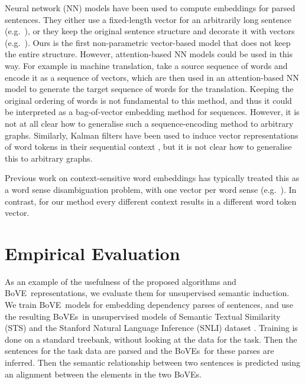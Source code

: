 \documentclass[11pt,a4paper]{article}
\newcommand{\bove}{Bo{\nolinebreak\hspace{-0.25ex}}VE}
\newcommand{\boves}{Bo{\nolinebreak\hspace{-0.25ex}}VEs}
\begin{document}
Neural network (NN) models have been used to compute embeddings for
parsed sentences.  They either use a fixed-length vector for an arbitrarily long
sentence (e.g.\ \cite{Socher2011_nips}), or they keep the
original sentence structure and decorate it with vectors
(e.g.\ \cite{Henderson03_naacl,socher13}).  Ours is the first non-parametric
vector-based model that does not keep the entire structure.  However,
attention-based NN models could be used in this way.  For example in machine
translation, \citet{bahdanau14} take a source sequence of words and encode it
as a sequence of vectors, which are then used in an attention-based NN model
to generate the target sequence of words for the translation.  Keeping the
original ordering of words is not fundamental to this method, and thus it
could be interpreted as a bag-of-vector embedding method for sequences.
However, it is not at all clear how to generalise such a sequence-encoding
method to 
arbitrary graphs.  Similarly, Kalman filters have been used to induce vector
representations of word tokens in their sequential context
\cite{Belanger2015}, but it is not clear how to generalise this to arbitrary
graphs.

Previous work on context-sensitive word embeddings has typically treated this
as a word sense disambiguation problem, with one vector per word sense
(e.g.\ \cite{Neelakantan2015,Liu2015_ijcai}).
In contrast, for our method every different context results in a different
word token vector.





\section{Empirical Evaluation}

As an example of the usefulness of the proposed algorithms and
\bove\ representations, we evaluate them for unsupervised semantic induction.
We train \bove\ models for embedding dependency parses of sentences, and use
the resulting \boves\ in unsupervised models of Semantic Textual Similarity
(STS) \cite{agirre2014semeval,Agirre2015SemEval2015T2} and the Stanford
Natural Language 
Inference (SNLI) dataset \cite{snli:emnlp2015}.  Training is done on a
standard treebank, without looking at the data for the task.  Then the
sentences for the task data are parsed and the \boves\ for these parses are
inferred.  Then the semantic relationship between two sentences is predicted
using an alignment between the elements in the two \boves.
\end{document}
